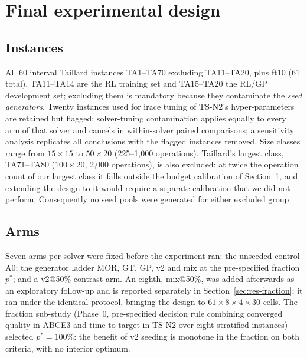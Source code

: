 \documentclass[review]{elsarticle}
\begin{document}
\section{Final experimental design}\label{sec:design}

\subsection{Instances}
All 60 interval Taillard instances TA1--TA70 excluding TA11--TA20, plus
ft10 (61 total). TA11--TA14 are the RL training set and TA15--TA20 the
RL/GP development set; excluding them is mandatory because they contaminate
the \emph{seed generators}. Twenty instances used for irace tuning of
TS-N2's hyper-parameters are retained but flagged: solver-tuning
contamination applies equally to every arm of that solver and cancels in
within-solver paired comparisons; a sensitivity analysis replicates all
conclusions with the flagged instances removed. Size classes range from
$15{\times}15$ to $50{\times}20$ (225--1{,}000 operations). Taillard's
largest class, TA71--TA80 ($100{\times}20$, 2{,}000 operations), is also
excluded: at twice the operation count of our largest class it falls
outside the budget calibration of Section~\ref{sec:design}, and extending
the design to it would require a separate calibration that we did not
perform. Consequently no seed pools were generated for either excluded
group.

\subsection{Arms}
Seven arms per solver were fixed before the experiment ran: the unseeded
control A0; the generator ladder MOR, GT, GP, v2 and mix at the
pre-specified fraction $p^{*}$; and a v2@50\% contrast arm. An eighth,
mix@50\%, was added afterwards as an exploratory follow-up and is reported
separately in Section~\ref{sec:res-fraction}; it ran under the identical
protocol, bringing the design to $61\times8\times4\times30$ cells. The
fraction sub-study (Phase~0, pre-specified
decision rule combining converged quality in ABCE3 and time-to-target in
TS-N2 over eight stratified instances) selected $p^{*}=100\%$: the benefit
of v2 seeding is monotone in the fraction on both criteria, with no
interior optimum.
\end{document}
